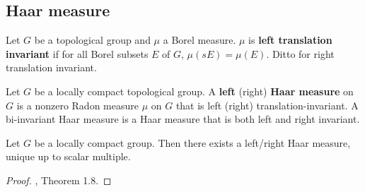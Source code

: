 \subsection{Haar measure}
\begin{df}
Let $G$ be a topological group and $\mu$ a Borel measure. $\mu$ is \textbf{left translation invariant} if for all Borel subsets $E$ of $G$, $\mu(sE)=\mu(E)$. Ditto for right translation invariant.

Let $G$ be a locally compact topological group. A \textbf{left} (right) \textbf{Haar measure} on $G$ is a nonzero Radon measure $\mu$ on $G$ that is left (right) translation-invariant. A bi-invariant Haar measure is a Haar measure that is both left and right invariant.
\end{df}
\begin{thm}
Let $G$ be a locally compact group. Then there exists a left/right Haar measure, unique up to scalar multiple.
\end{thm}
\begin{proof}
\cite{RV99}, Theorem 1.8.
\end{proof}
